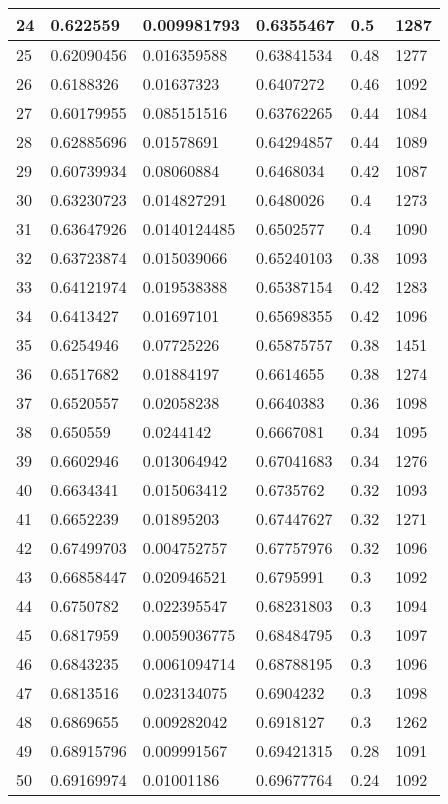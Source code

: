\begin{longtable}{|l|l|l|l|l|l|}
24 & 0.622559 & 0.009981793 & 0.6355467 & 0.5 & 1287 \\ \hline 
25 & 0.62090456 & 0.016359588 & 0.63841534 & 0.48 & 1277 \\ \hline 
26 & 0.6188326 & 0.01637323 & 0.6407272 & 0.46 & 1092 \\ \hline 
27 & 0.60179955 & 0.085151516 & 0.63762265 & 0.44 & 1084 \\ \hline 
28 & 0.62885696 & 0.01578691 & 0.64294857 & 0.44 & 1089 \\ \hline 
29 & 0.60739934 & 0.08060884 & 0.6468034 & 0.42 & 1087 \\ \hline 
30 & 0.63230723 & 0.014827291 & 0.6480026 & 0.4 & 1273 \\ \hline 
31 & 0.63647926 & 0.0140124485 & 0.6502577 & 0.4 & 1090 \\ \hline 
32 & 0.63723874 & 0.015039066 & 0.65240103 & 0.38 & 1093 \\ \hline 
33 & 0.64121974 & 0.019538388 & 0.65387154 & 0.42 & 1283 \\ \hline 
34 & 0.6413427 & 0.01697101 & 0.65698355 & 0.42 & 1096 \\ \hline 
35 & 0.6254946 & 0.07725226 & 0.65875757 & 0.38 & 1451 \\ \hline 
36 & 0.6517682 & 0.01884197 & 0.6614655 & 0.38 & 1274 \\ \hline 
37 & 0.6520557 & 0.02058238 & 0.6640383 & 0.36 & 1098 \\ \hline 
38 & 0.650559 & 0.0244142 & 0.6667081 & 0.34 & 1095 \\ \hline 
39 & 0.6602946 & 0.013064942 & 0.67041683 & 0.34 & 1276 \\ \hline 
40 & 0.6634341 & 0.015063412 & 0.6735762 & 0.32 & 1093 \\ \hline 
41 & 0.6652239 & 0.01895203 & 0.67447627 & 0.32 & 1271 \\ \hline 
42 & 0.67499703 & 0.004752757 & 0.67757976 & 0.32 & 1096 \\ \hline 
43 & 0.66858447 & 0.020946521 & 0.6795991 & 0.3 & 1092 \\ \hline 
44 & 0.6750782 & 0.022395547 & 0.68231803 & 0.3 & 1094 \\ \hline 
45 & 0.6817959 & 0.0059036775 & 0.68484795 & 0.3 & 1097 \\ \hline 
46 & 0.6843235 & 0.0061094714 & 0.68788195 & 0.3 & 1096 \\ \hline 
47 & 0.6813516 & 0.023134075 & 0.6904232 & 0.3 & 1098 \\ \hline 
48 & 0.6869655 & 0.009282042 & 0.6918127 & 0.3 & 1262 \\ \hline 
49 & 0.68915796 & 0.009991567 & 0.69421315 & 0.28 & 1091 \\ \hline 
50 & 0.69169974 & 0.01001186 & 0.69677764 & 0.24 & 1092 \\ \hline 
\end{longtable}